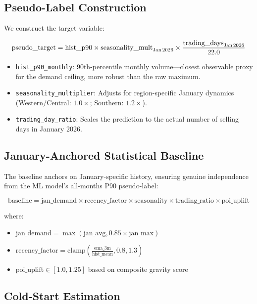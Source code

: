 \documentclass[10.75pt, a4paper]{article}
\begin{document}
\subsection{Pseudo-Label Construction}

We construct the target variable:

\begin{equation}
\text{pseudo\_target} = \text{hist\_p90} \times \text{seasonality\_mult}_{\text{Jan\,2026}} \times \frac{\text{trading\_days}_{\text{Jan\,2026}}}{22.0}
\end{equation}

\begin{itemize}
    \item \texttt{hist\_p90\_monthly}: 90th-percentile monthly volume---closest observable proxy for the demand ceiling, more robust than the raw maximum.
    \item \texttt{seasonality\_multiplier}: Adjusts for region-specific January dynamics (Western/Central: $1.0\times$; Southern: $1.2\times$).
    \item \texttt{trading\_day\_ratio}: Scales the prediction to the actual number of selling days in January 2026.
\end{itemize}

\subsection{January-Anchored Statistical Baseline}

The baseline anchors on January-specific history, ensuring genuine independence from the ML model's all-months P90 pseudo-label:

\begin{equation}
\text{baseline} = \text{jan\_demand} \times \text{recency\_factor} \times \text{seasonality} \times \text{trading\_ratio} \times \text{poi\_uplift}
\end{equation}

\noindent where:
\begin{itemize}
    \item $\text{jan\_demand} = \max(\text{jan\_avg}, 0.85 \times \text{jan\_max})$
    \item $\text{recency\_factor} = \text{clamp}\left(\frac{\text{ema\_3m}}{\text{hist\_mean}}, 0.8, 1.3\right)$
    \item $\text{poi\_uplift} \in [1.0, 1.25]$ based on composite gravity score
\end{itemize}

\subsection{Cold-Start Estimation}
\end{document}
